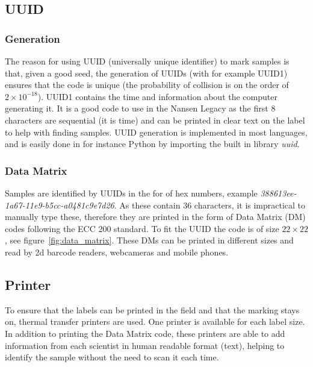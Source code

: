 \documentclass[a4paper,english, 11pt]{article}
\begin{document}
\subsection{UUID} %
\label{sub:UUID}

\subsubsection{Generation} %
\label{ssub:Generation}

The reason for using UUID (universally unique identifier) to mark samples is that, given a good seed, the generation of UUIDs (with for example UUID1) ensures that the code is unique (the probability of collision is on the order of $ 2\times10^{-18}$). UUID1 contains the time and information about the computer generating it. It is a good code to use in the Nansen Legacy as the first 8 characters are sequential (it is time) and can be printed in clear text on the label to help with finding samples. UUID generation is implemented in most languages, and is easily done in for instance Python by importing the built in library \emph{uuid}. 


\subsubsection{Data Matrix} %
\label{ssub:DM}
Samples are identified by UUIDs in the for of hex numbers, example \emph{388613ee-1a67-11e9-b5cc-a0481c9e7d26}. As these contain 36 characters, it is impractical to manually type these, therefore they are printed in the form of  Data Matrix (DM) codes following the ECC 200 standard. To fit the UUID the code is of size  $22\times22$, see figure~\ref{fig:data_matrix}. These DMs can be printed in different sizes and read by 2d barcode readers, webcameras and mobile phones. 



\subsection{Printer} %
\label{sub:Printer}
To ensure that the labels can be printed in the field and that the marking stays on, thermal transfer printers are used. One printer is available for each label size. In addition to printing the Data Matrix code, these printers are able to add information from each scientist in human readable format (text), helping to identify the sample without the need to scan it each time.
\end{document}
